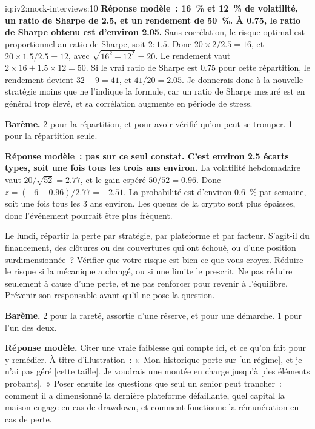 \begin{solution}{iq:iv2:mock-interviews:10}
\ivstop
\textbf{Réponse modèle~: 16~\% et 12~\% de volatilité, un ratio de Sharpe de 2.5, et un rendement de 50~\%. À 0.75, le ratio de Sharpe obtenu est d'environ 2.05.} Sans corrélation, le risque optimal est proportionnel au ratio de Sharpe, soit $2:1.5$. Donc $20 \times 2/2.5 = 16$, et $20 \times 1.5/2.5 = 12$, avec $\sqrt{16^2 + 12^2} = 20$. Le rendement vaut $2 \times 16 + 1.5 \times 12 = 50$. Si le vrai ratio de Sharpe est 0.75 pour cette répartition, le rendement devient $32 + 9 = 41$, et $41/20 = 2.05$. Je donnerais donc à la nouvelle stratégie moins que ne l'indique la formule, car un ratio de Sharpe mesuré est en général trop élevé, et sa corrélation augmente en période de stress.

\textbf{Barème.} 2 pour la répartition, et pour avoir vérifié qu'on peut se tromper. 1 pour la répartition seule.

\ivstop
\textbf{Réponse modèle~: pas sur ce seul constat. C'est environ 2.5 écarts types, soit une fois tous les trois ans environ.} La volatilité hebdomadaire vaut $20/\sqrt{52} = 2.77$, et le gain espéré $50/52 = 0.96$. Donc $z = (-6 - 0.96)/2.77 = -2.51$. La probabilité est d'environ 0.6~\% par semaine, soit une fois tous les 3 ans environ. Les queues de la crypto sont plus épaisses, donc l'événement pourrait être plus fréquent.

Le lundi, répartir la perte par stratégie, par plateforme et par facteur. S'agit-il du financement, des clôtures ou des couvertures qui ont échoué, ou d'une position surdimensionnée~? Vérifier que votre risque est bien ce que vous croyez. Réduire le risque si la mécanique a changé, ou si une limite le prescrit. Ne pas réduire seulement à cause d'une perte, et ne pas renforcer pour revenir à l'équilibre. Prévenir son responsable avant qu'il ne pose la question.

\textbf{Barème.} 2 pour la rareté, assortie d'une réserve, et pour une démarche. 1 pour l'un des deux.

\ivstop
\textbf{Réponse modèle.} Citer une vraie faiblesse qui compte ici, et ce qu'on fait pour y remédier. À titre d'illustration~: «~Mon historique porte sur [un régime], et je n'ai pas géré [cette taille]. Je voudrais une montée en charge jusqu'à [des éléments probants].~» Poser ensuite les questions que seul un senior peut trancher~: comment il a dimensionné la dernière plateforme défaillante, quel capital la maison engage en cas de drawdown, et comment fonctionne la rémunération en cas de perte.


\end{solution}
